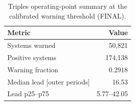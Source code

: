 \begin{table}
  \centering
  \caption{Triples operating-point summary at the calibrated warning threshold (FINAL).}
  \label{tab:triples_decision}
  \begin{tabular}{lr}
    \toprule
    Metric & Value \\
    \midrule
    Systems warned & 50,821 \\
    Positive systems & 174,138 \\
    Warning fraction & 0.2918 \\
    Median lead [outer periods] & 16.53 \\
    Lead p25--p75 & 5.77--42.05 \\
    \bottomrule
  \end{tabular}
\end{table}
